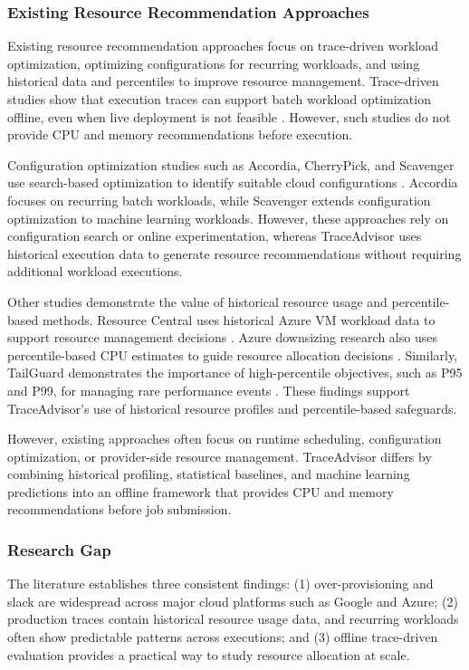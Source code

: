 \subsubsection{Existing Resource Recommendation Approaches}\label{sec:1.3.3}

Existing resource recommendation approaches focus on trace-driven workload optimization, optimizing configurations for recurring workloads, and using historical data and percentiles to improve resource management. Trace-driven studies show that execution traces can support batch workload optimization offline, even when live deployment is not feasible \cite{ref14}. However, such studies do not provide CPU and memory recommendations before execution.

Configuration optimization studies such as Accordia, CherryPick, and Scavenger use search-based optimization to identify suitable cloud configurations \cite{ref3,ref15,ref16}. Accordia focuses on recurring batch workloads, while Scavenger extends configuration optimization to machine learning workloads. However, these approaches rely on configuration search or online experimentation, whereas TraceAdvisor uses historical execution data to generate resource recommendations without requiring additional workload executions.

Other studies demonstrate the value of historical resource usage and percentile-based methods. Resource Central uses historical Azure VM workload data to support resource management decisions \cite{ref2}. Azure downsizing research also uses percentile-based CPU estimates to guide resource allocation decisions \cite{ref17}. Similarly, TailGuard demonstrates the importance of high-percentile objectives, such as P95 and P99, for managing rare performance events \cite{ref18}. These findings support TraceAdvisor's use of historical resource profiles and percentile-based safeguards.

However, existing approaches often focus on runtime scheduling, configuration optimization, or provider-side resource management. TraceAdvisor differs by combining historical profiling, statistical baselines, and machine learning predictions into an offline framework that provides CPU and memory recommendations before job submission.

\subsubsection{Research Gap}\label{sec:1.3.4}

The literature establishes three consistent findings: (1) over-provisioning and slack are widespread across major cloud platforms such as Google and Azure; (2) production traces contain historical resource usage data, and recurring workloads often show predictable patterns across executions; and (3) offline trace-driven evaluation provides a practical way to study resource allocation at scale.

